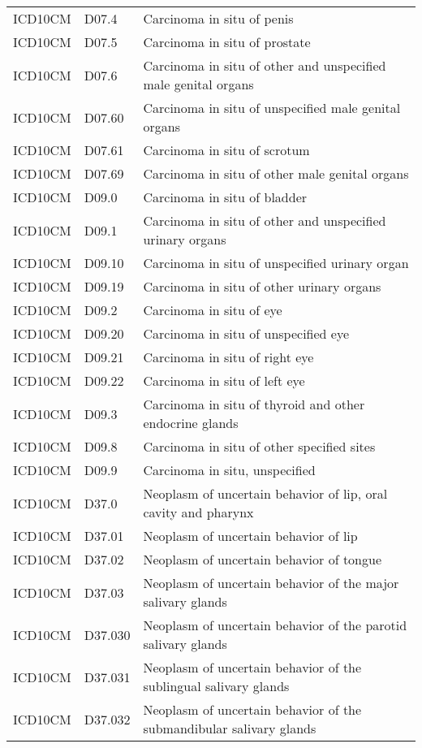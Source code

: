 \begin{longtable}{p{}p{}p{}}
  ICD10CM & D07.4 & Carcinoma in situ of penis \\ 
  ICD10CM & D07.5 & Carcinoma in situ of prostate \\ 
  ICD10CM & D07.6 & Carcinoma in situ of other and unspecified male genital organs \\ 
  ICD10CM & D07.60 & Carcinoma in situ of unspecified male genital organs \\ 
  ICD10CM & D07.61 & Carcinoma in situ of scrotum \\ 
  ICD10CM & D07.69 & Carcinoma in situ of other male genital organs \\ 
  ICD10CM & D09.0 & Carcinoma in situ of bladder \\ 
  ICD10CM & D09.1 & Carcinoma in situ of other and unspecified urinary organs \\ 
  ICD10CM & D09.10 & Carcinoma in situ of unspecified urinary organ \\ 
  ICD10CM & D09.19 & Carcinoma in situ of other urinary organs \\ 
  ICD10CM & D09.2 & Carcinoma in situ of eye \\ 
  ICD10CM & D09.20 & Carcinoma in situ of unspecified eye \\ 
  ICD10CM & D09.21 & Carcinoma in situ of right eye \\ 
  ICD10CM & D09.22 & Carcinoma in situ of left eye \\ 
  ICD10CM & D09.3 & Carcinoma in situ of thyroid and other endocrine glands \\ 
  ICD10CM & D09.8 & Carcinoma in situ of other specified sites \\ 
  ICD10CM & D09.9 & Carcinoma in situ, unspecified \\ 
  ICD10CM & D37.0 & Neoplasm of uncertain behavior of lip, oral cavity and pharynx \\ 
  ICD10CM & D37.01 & Neoplasm of uncertain behavior of lip \\ 
  ICD10CM & D37.02 & Neoplasm of uncertain behavior of tongue \\ 
  ICD10CM & D37.03 & Neoplasm of uncertain behavior of the major salivary glands \\ 
  ICD10CM & D37.030 & Neoplasm of uncertain behavior of the parotid salivary glands \\ 
  ICD10CM & D37.031 & Neoplasm of uncertain behavior of the sublingual salivary glands \\ 
  ICD10CM & D37.032 & Neoplasm of uncertain behavior of the submandibular salivary glands \\ 

\end{longtable}
